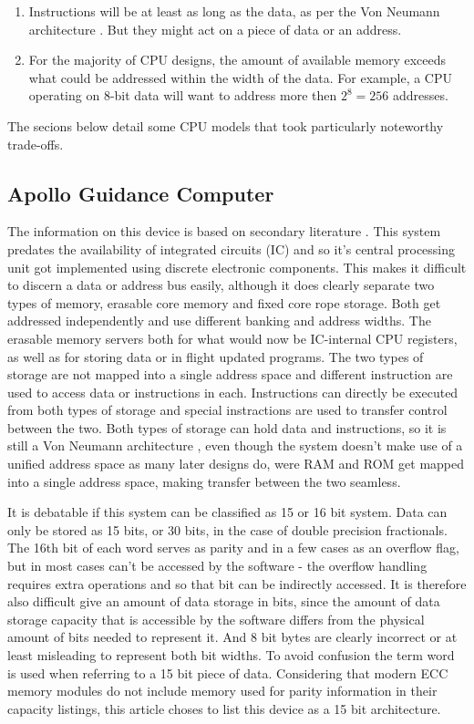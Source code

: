 \documentclass[twoside,twocolumn]{article}
\begin{document}
\begin{enumerate}[1)]
\item Instructions will be at least as long as the data, as per the Von Neumann
architecture \cite{edvac}. But they might act on a piece of data or an address.
\item For the majority of CPU designs, the amount of available memory exceeds what could
be addressed within the width of the data. For example, a CPU operating on 8-bit data
will want to address more then $2^8 = 256$ addresses.
\end{enumerate}

The secions below detail some CPU models that took particularly noteworthy trade-offs.

\subsection{Apollo Guidance Computer}

The information on this device is based on secondary literature \cite{agc}. This system
predates the availability of integrated circuits (IC) and so it's central processing unit
got implemented using discrete electronic components. This makes it difficult to discern
a data or address bus easily, although it does clearly separate two types of memory,
erasable core memory and fixed core rope storage. Both get addressed independently and
use different banking and address widths. The erasable memory servers both for what would
now be IC-internal CPU registers, as well as for storing data or in flight updated
programs. The two types of storage are not mapped into a single address space and
different instruction are used to access data or instructions in each. Instructions can
directly be executed from both types of storage and special instractions are used to
transfer control between the two. Both types of storage can hold data and instructions,
so it is still a Von Neumann architecture \cite{edvac}, even though the system doesn't
make use of a unified address space as many later designs do, were RAM and ROM get mapped
into a single address space, making transfer between the two seamless.

It is debatable if this system can be classified as 15 or 16 bit system. Data can only be
stored as 15 bits, or 30 bits, in the case of double precision fractionals. The 16th bit
of each word serves as parity and in a few cases as an overflow flag, but in most cases
can't be accessed by the software - the overflow handling requires extra operations and
so that bit can be indirectly accessed. It is therefore also difficult give an amount of
data storage in bits, since the amount of data storage capacity that is accessible by the
software differs from the physical amount of bits needed to represent it. And 8 bit bytes
are clearly incorrect or at least misleading to represent both bit widths. To avoid
confusion the term word is used when referring to a 15 bit piece of data. Considering
that modern ECC memory modules do not include memory used for parity information in their
capacity listings, this article choses to list this device as a 15 bit architecture.
\end{document}
